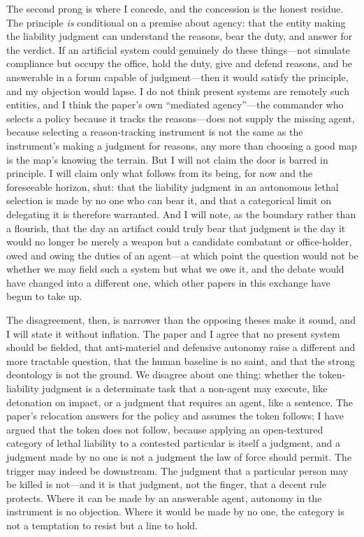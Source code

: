 \documentclass[11pt]{article}
\begin{document}
The second prong is where I concede, and the concession is the honest residue. The principle \emph{is} conditional on a premise about agency: that the entity making the liability judgment can understand the reasons, bear the duty, and answer for the verdict. If an artificial system could genuinely do these things---not simulate compliance but occupy the office, hold the duty, give and defend reasons, and be answerable in a forum capable of judgment---then it would satisfy the principle, and my objection would lapse. I do not think present systems are remotely such entities, and I think the paper's own ``mediated agency''---the commander who selects a policy because it tracks the reasons---does not supply the missing agent, because selecting a reason-tracking instrument is not the same as the instrument's making a judgment for reasons, any more than choosing a good map is the map's knowing the terrain. But I will not claim the door is barred in principle. I will claim only what follows from its being, for now and the foreseeable horizon, shut: that the liability judgment in an autonomous lethal selection is made by no one who can bear it, and that a categorical limit on delegating it is therefore warranted. And I will note, as the boundary rather than a flourish, that the day an artifact could truly bear that judgment is the day it would no longer be merely a weapon but a candidate combatant or office-holder, owed and owing the duties of an agent---at which point the question would not be whether we may field such a system but what we owe it, and the debate would have changed into a different one, which other papers in this exchange have begun to take up.

The disagreement, then, is narrower than the opposing theses make it sound, and I will state it without inflation. The paper and I agree that no present system should be fielded, that anti-materiel and defensive autonomy raise a different and more tractable question, that the human baseline is no saint, and that the strong deontology is not the ground. We disagree about one thing: whether the token-liability judgment is a determinate task that a non-agent may execute, like detonation on impact, or a judgment that requires an agent, like a sentence. The paper's relocation answers for the policy and assumes the token follows; I have argued that the token does not follow, because applying an open-textured category of lethal liability to a contested particular is itself a judgment, and a judgment made by no one is not a judgment the law of force should permit. The trigger may indeed be downstream. The judgment that a particular person may be killed is not---and it is that judgment, not the finger, that a decent rule protects. Where it can be made by an answerable agent, autonomy in the instrument is no objection. Where it would be made by no one, the category is not a temptation to resist but a line to hold.
\end{document}
